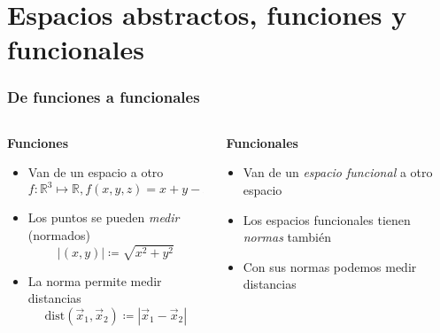 \documentclass[12pt,aspectratio=169,xcolor=dvipsnames]{beamer}
\begin{document}
\section{Espacios abstractos, funciones y funcionales}
\begin{frame}\frametitle{De funciones a funcionales}

    \begin{columns}[t]
        \begin{column}[t]{0.49\textwidth}
        {\bf Funciones}
        
            \begin{itemize}
                \item<+-> Van de un espacio a otro
                    $$ f: \mathbb R^3 \mapsto \mathbb R, f(x,y,z) = x+y-z $$
                \item<+-> Los puntos se pueden \emph{medir} (normados)
                    $$ |(x,y)| \coloneqq \sqrt{x^2+y^2} $$
                \item<+-> La norma permite medir distancias
                    $$ \text{dist}( \vec x_1, \vec x_2) \coloneqq |\vec x_1 - \vec x_2| $$
            \end{itemize}
        
        \end{column}

        \vline 
        \begin{column}[t]{0.49\textwidth}
        \,\,{\bf Funcionales}

            \begin{itemize}
                \item<+-> Van de un \emph{espacio funcional} a otro espacio
                \item<+-> Los espacios funcionales tienen \emph{normas} también 
                \item<+-> Con sus normas podemos medir distancias
            \end{itemize}
        \end{column}
    \end{columns}
\end{frame}
\end{document}
